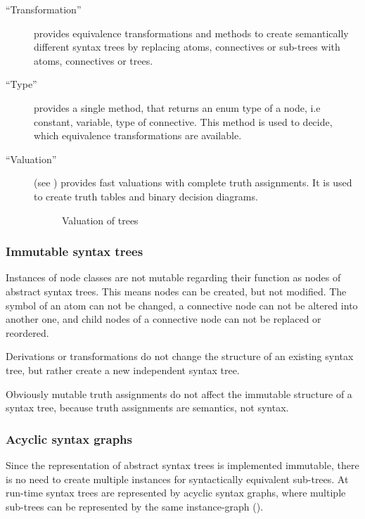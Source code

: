 \begin{description}
\item[“Transformation”] provides equivalence transformations 
and methods to create 
 semantically different syntax trees by replacing atoms, connectives or sub-trees with
atoms, connectives or trees.

\item[“Type”] provides a single method, 
that returns an enum type of a node, i.e constant, variable, type of connective. 
This method is used to decide, which equivalence transformations are available.

\item[“Valuation”] (see ) 
provides fast valuations with complete truth assignments. 
It is used to create truth tables and binary decision diagrams. 

\begin{figure}[htbp]
\begin{center}
\caption{Valuation of trees}
\label{fig:NyayaNodeValuation}
\end{center}
\end{figure}

\end{description}
\subsubsection{Immutable syntax trees}

Instances of node classes are not mutable 
regarding their function as nodes of abstract syntax trees. 
This means nodes can be created, but not modified.
The symbol of an atom can not be changed, 
a connective node can not be altered into another one,
and child nodes of a connective node can not be replaced or reordered.

Derivations or transformations do not change the structure of an existing syntax tree,
but rather create a new independent syntax tree.

Obviously mutable truth assignments do not affect the immutable structure of a syntax tree,
because truth assignments are semantics, not syntax. 

\subsubsection{Acyclic syntax graphs}

Since the representation of abstract syntax trees is implemented immutable,
there is no need to create multiple instances for syntactically equivalent sub-trees. 
At run-time syntax trees are represented by acyclic syntax graphs, 
where multiple sub-trees can be represented by the same instance-graph
().

